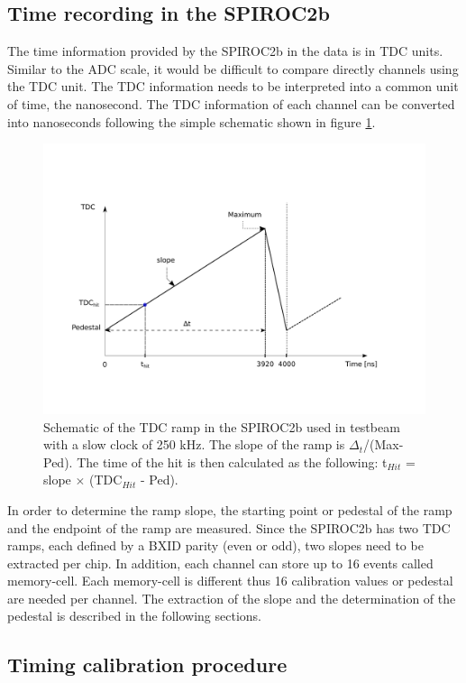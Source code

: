 \documentclass{JINST}
\begin{document}
\subsection{Time recording in the SPIROC2b}

The time information provided by the SPIROC2b in the data is in TDC units. Similar to the ADC scale, it would be difficult to compare directly channels using the TDC unit. The TDC information needs to be interpreted into a common unit of time, the nanosecond. The TDC information of each channel can be converted into nanoseconds following the simple schematic shown in figure \ref{fig:ConvertTime}.

\begin{figure}[htbp!]
	\centering
	\includegraphics[width=0.9\linewidth]{fig/TDCRamp.pdf}
	\caption{Schematic of the TDC ramp in the SPIROC2b used in testbeam with a slow clock of 250 kHz. The slope of the ramp is $\Delta_t$/(Max-Ped). The time of the hit is then calculated as the following: t$_{Hit}$ = slope $\times$ (TDC$_{Hit}$ - Ped).} \label{fig:ConvertTime}
\end{figure}

In order to determine the ramp slope, the starting point or pedestal of the ramp and the endpoint of the ramp are measured. Since the SPIROC2b has two TDC ramps, each defined by a BXID parity (even or odd), two slopes need to be extracted per chip. In addition, each channel can store up to 16 events called memory-cell. Each memory-cell is different thus 16 calibration values or pedestal are needed per channel. The extraction of the slope and the determination of the pedestal is described in the following sections.

\subsection{Timing calibration procedure}
\end{document}
